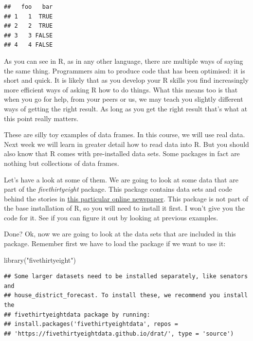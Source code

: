 \documentclass[
]{book}
\newenvironment{Shaded}{\begin{snugshade}}{\end{snugshade}}
\newcommand{\FunctionTok}[1]{\textcolor[rgb]{0.00,0.00,0.00}{#1}}
\newcommand{\NormalTok}[1]{#1}
\newcommand{\StringTok}[1]{\textcolor[rgb]{0.31,0.60,0.02}{#1}}
\begin{document}
\begin{verbatim}
##   foo   bar
## 1   1  TRUE
## 2   2  TRUE
## 3   3 FALSE
## 4   4 FALSE
\end{verbatim}

As you can see in R, as in any other language, there are multiple ways of saying the same thing. Programmers aim to produce code that has been optimised: it is short and quick. It is likely that as you develop your R skills you find increasingly more efficient ways of asking R how to do things. What this means too is that when you go for help, from your peers or us, we may teach you slightly different ways of getting the right result. As long as you get the right result that's what at this point really matters.

These are silly toy examples of data frames. In this course, we will use real data. Next week we will learn in greater detail how to read data into R. But you should also know that R comes with pre-installed data sets. Some packages in fact are nothing but collections of data frames.

Let's have a look at some of them. We are going to look at some data that are part of the \emph{fivethirtyeight} package. This package contains data sets and code behind the stories in \href{http://fivethirtyeight.com/}{this particular online newspaper}. This package is not part of the base installation of R, so you will need to install it first. I won't give you the code for it. See if you can figure it out by looking at previous examples.

Done? Ok, now we are going to look at the data sets that are included in this package. Remember first we have to load the package if we want to use it:

\begin{Shaded}
\begin{Highlighting}[]
\FunctionTok{library}\NormalTok{(}\StringTok{"fivethirtyeight"}\NormalTok{)}
\end{Highlighting}
\end{Shaded}

\begin{verbatim}
## Some larger datasets need to be installed separately, like senators and
## house_district_forecast. To install these, we recommend you install the
## fivethirtyeightdata package by running:
## install.packages('fivethirtyeightdata', repos =
## 'https://fivethirtyeightdata.github.io/drat/', type = 'source')
\end{verbatim}
\end{document}
